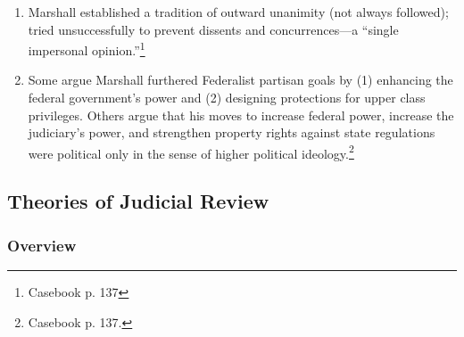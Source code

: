 \begin{enumerate}
\begin{enumerate}
    \item Marshall established a tradition of outward unanimity (not always 
    followed); tried unsuccessfully to prevent dissents and concurrences---a 
    ``single impersonal opinion.''\footnote{Casebook p. 137}
    \item Some argue Marshall furthered Federalist partisan goals by (1) 
    enhancing the federal government's power and (2) designing protections for 
    upper class privileges. Others argue that his moves to increase federal 
    power, increase the judiciary's power, and strengthen property rights 
    against state regulations were political only in the sense of higher 
    political ideology.\footnote{Casebook p. 137.}
\end{enumerate}

\subsection{Theories of Judicial Review}

\subsubsection{Overview}


\end{enumerate}
